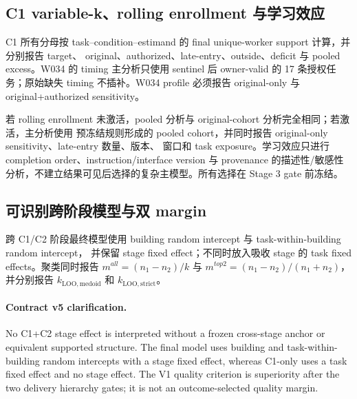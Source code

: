\subsection{C1 variable-k、rolling enrollment 与学习效应}

C1 所有分母按 task--condition--estimand 的 final unique-worker support 计算，并分别报告 target、
original、authorized、late-entry、outside、deficit 与 pooled excess。W034 的 timing 主分析只使用
sentinel 后 owner-valid 的 17 条授权任务；原始缺失 timing 不插补。W034 profile 必须报告
original-only 与 original+authorized sensitivity。

若 rolling enrollment 未激活，pooled 分析与 original-cohort 分析完全相同；若激活，主分析使用
预冻结规则形成的 pooled cohort，并同时报告 original-only sensitivity、late-entry 数量、版本、
窗口和 task exposure。学习效应只进行 completion order、instruction/interface version 与 provenance
的描述性/敏感性分析，不建立结果可见后选择的复杂主模型。所有选择在 Stage 3 gate 前冻结。

\subsection{可识别跨阶段模型与双 margin}

跨 C1/C2 阶段最终模型使用 building random intercept 与 task-within-building random intercept，
并保留 stage fixed effect；不同时放入吸收 stage 的 task fixed effects。聚类同时报告
\(m^{all}=(n_1-n_2)/k\) 与 \(m^{top2}=(n_1-n_2)/(n_1+n_2)\)，并分别报告
\(k_{\mathrm{LOO,medoid}}\) 和 \(k_{\mathrm{LOO,strict}}\)。

\paragraph{Contract v5 clarification.}
No C1+C2 stage effect is interpreted without a frozen cross-stage anchor or equivalent supported structure. The final model uses building and task-within-building random intercepts with a stage fixed effect, whereas C1-only uses a task fixed effect and no stage effect. The V1 quality criterion is superiority after the two delivery hierarchy gates; it is not an outcome-selected quality margin.
